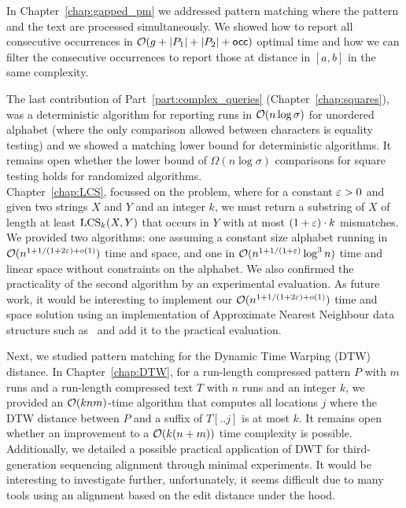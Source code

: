 In Chapter~\ref{chap:gapped_pm} we addressed pattern matching where the pattern and the text are processed simultaneously. We showed how to report all consecutive occurrences in $\mathcal{O}(g+|P_1|+|P_2|+\mathsf{occ})$ optimal time and how we can filter the consecutive occurrences to report those at distance in $[a,b]$ in the same complexity.

The last contribution of Part~\ref{part:complex_queries} (Chapter~\ref{chap:squares}), was a deterministic algorithm for reporting runs in $\mathcal{O}(n\log\sigma)$ for unordered alphabet (where the only comparison allowed between characters is equality testing) and we showed a matching lower bound for deterministic algorithms. It remains open whether the lower bound of $\Omega(n\log \sigma)$ comparisons for square testing holds for randomized algorithms.\\


Chapter~\ref{chap:LCS}, focussed on the \kApproxLCS problem, where for a constant $\varepsilon > 0$ and given two strings $X$ and $Y$ and an integer $k$, we must return a substring of $X$ of length at least $\mathrm{LCS}_{k}(X,Y)$ that occurs in $Y$ with at most $(1+\varepsilon) \cdot k$ mismatches. We provided two algorithms: one assuming a constant size alphabet running in $\mathcal{O}(n^{1+ 1/(1+2\varepsilon) + o(1)})$ time and space, and one in $\mathcal{O}(n^{1+1/(1+\varepsilon)} \log^3 n)$ time and linear space without constraints on the alphabet.  We also confirmed the practicality of the second algorithm by an experimental evaluation.
As future work, it would be interesting to implement our $\mathcal{O}(n^{1+ 1/(1+2\varepsilon) + o(1)})$ time and space solution using an implementation of Approximate Nearest Neighbour data structure such as~\cite{spotify_annoy} and add it to the practical evaluation.

Next, we studied pattern matching for the Dynamic Time Warping (DTW) distance. In Chapter~\ref{chap:DTW}, for a run-length compressed pattern $P$ with $m$ runs and a run-length compressed text $T$ with $n$ runs and an integer $k$, we provided an $\mathcal{O}(knm)$-time algorithm that computes all locations $j$ where the DTW distance between $P$ and a suffix of $T[..j]$ is at most $k$. It remains open whether an improvement to a $\mathcal{O}(k(n+m))$ time complexity is possible. Additionally, we detailed a possible practical application of DWT for third-generation sequencing alignment through minimal experiments. It
would be interesting to investigate further, unfortunately, it seems difficult due to many tools using an alignment based on the edit distance under the hood.    

